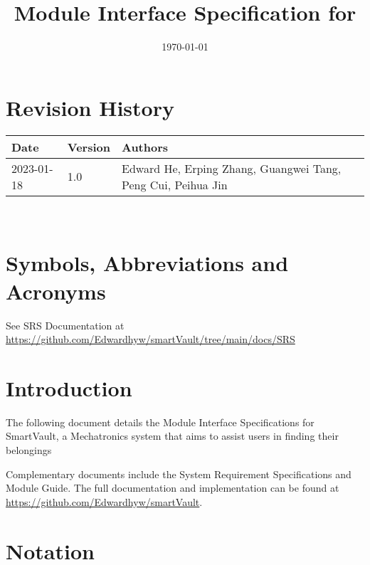\documentclass[12pt, titlepage]{article}
\begin{document}
\title{Module Interface Specification for \progname{}}

\author{\authname}

\date{\today}

\maketitle


\section{Revision History}

\begin{tabularx}{\textwidth}{p{3cm}p{2cm}X}
\toprule {\bf Date} & {\bf Version} & {\bf Authors}\\
\midrule
2023-01-18 & 1.0 & Edward He, Erping Zhang, Guangwei Tang, Peng Cui, Peihua Jin\\
\bottomrule
\end{tabularx}

~\newpage

\section{Symbols, Abbreviations and Acronyms}

See SRS Documentation at \url{https://github.com/Edwardhyw/smartVault/tree/main/docs/SRS}


\newpage

\tableofcontents

\newpage


\section{Introduction}

The following document details the Module Interface Specifications for
SmartVault, a Mechatronics system that aims to assist users in finding their belongings

Complementary documents include the System Requirement Specifications
and Module Guide.  The full documentation and implementation can be
found at \url{https://github.com/Edwardhyw/smartVault}.  

\section{Notation}
\end{document}
